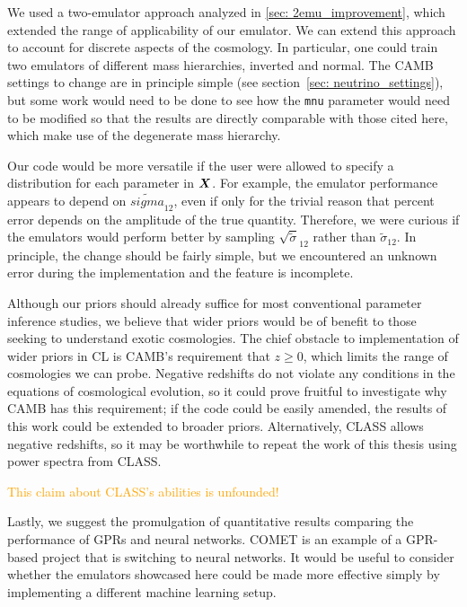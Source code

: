 We used a two-emulator approach analyzed in \ref{sec: 2emu_improvement},
which extended the range of applicability of our emulator. We can extend this
approach to account for discrete aspects of the cosmology. In particular, 
one could train two emulators of different mass hierarchies, inverted and
normal. The CAMB settings to change are in principle simple (see
section~\ref{sec: neutrino_settings}), but some work would need to be done to
see how the \texttt{mnu} parameter would need to be modified so that the
results are directly comparable with those cited here, which make use of the
degenerate mass hierarchy.

Our code would be more versatile if the user were allowed to specify a
distribution for each parameter in $\bm{X}$. For example, the emulator
performance appears to depend on $\tilde{sigma}_{12}$,
even if only for the trivial
reason that percent error depends on the amplitude of the true quantity.
Therefore, we were curious if the emulators would perform better by
sampling $\sqrt{\tilde{\sigma}}_{12}$ rather than $\tilde{\sigma}_{12}$.
In principle, the change should be fairly simple, but we encountered an
unknown error during the implementation and the feature is incomplete.



Although our priors should already suffice for most conventional parameter
inference studies, we believe that wider priors would be of benefit to those
seeking to understand exotic cosmologies. The chief obstacle to 
implementation of wider priors in CL is CAMB's requirement that $z \geq 0$,
which limits the range of cosmologies we can probe. 
Negative redshifts do not violate any conditions in the equations of
cosmological evolution, so it could prove fruitful to investigate why CAMB 
has this requirement; if the code could be easily amended, the results of
this work could be extended to broader priors. Alternatively,
CLASS allows negative redshifts, so it may be worthwhile 
to repeat the work of this thesis using power spectra from CLASS.

\textcolor{orange}{This claim about CLASS's abilities is unfounded!}

Lastly, we suggest the promulgation of quantitative results comparing the
performance of GPRs and neural networks. COMET is an example of a GPR-based
project that is switching to neural networks. It would be useful to consider
whether the emulators showcased here could be made more effective simply by
implementing a different machine learning setup. 

